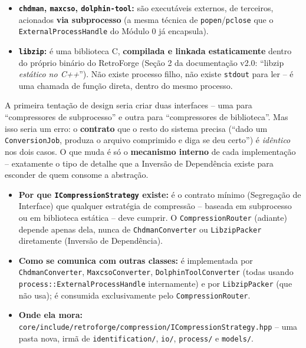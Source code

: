 \begin{itemize}
    \item \textbf{\texttt{chdman}, \texttt{maxcso}, \texttt{dolphin-tool}:} são executáveis externos, de terceiros, acionados \textbf{via subprocesso} (a mesma técnica de \texttt{popen}/\texttt{pclose} que o \texttt{ExternalProcessHandle} do Módulo 0 já encapsula).
    \item \textbf{\texttt{libzip}:} é uma biblioteca C, \textbf{compilada e linkada estaticamente} dentro do próprio binário do RetroForge (Seção 2 da documentação v2.0: ``libzip \textit{estático no C++}'').
Não existe processo filho, não existe \texttt{stdout} para ler -- é uma chamada de função direta, dentro do mesmo processo.
\end{itemize}

A primeira tentação de design seria criar duas interfaces -- uma para ``compressores de subprocesso'' e outra para ``compressores de biblioteca''.
Mas isso seria um erro: o \textbf{contrato} que o resto do sistema precisa (``dado um \texttt{ConversionJob}, produza o arquivo comprimido e diga se deu certo'') é \textit{idêntico} nos dois casos.
O que muda é só o \textbf{mecanismo interno} de cada implementação -- exatamente o tipo de detalhe que a Inversão de Dependência existe para esconder de quem consome a abstração.

\begin{itemize}
    \item \textbf{Por que \texttt{ICompressionStrategy} existe:} é o contrato mínimo (Segregação de Interface) que qualquer estratégia de compressão -- baseada em subprocesso ou em biblioteca estática -- deve cumprir.
O \texttt{CompressionRouter} (adiante) depende apenas dela, nunca de \texttt{ChdmanConverter} ou \texttt{LibzipPacker} diretamente (Inversão de Dependência).
    \item \textbf{Como se comunica com outras classes:} é implementada por \texttt{ChdmanConverter}, \texttt{MaxcsoConverter}, \texttt{DolphinToolConverter} (todas usando \texttt{process::ExternalProcessHandle} internamente) e por \texttt{LibzipPacker} (que não usa);
é consumida exclusivamente pelo \texttt{CompressionRouter}.
    \item \textbf{Onde ela mora:} \texttt{core/include/retroforge/compression/ICompressionStrategy.hpp} -- uma pasta nova, irmã de \texttt{identification/}, \texttt{io/}, \texttt{process/} e \texttt{models/}.
\end{itemize}

